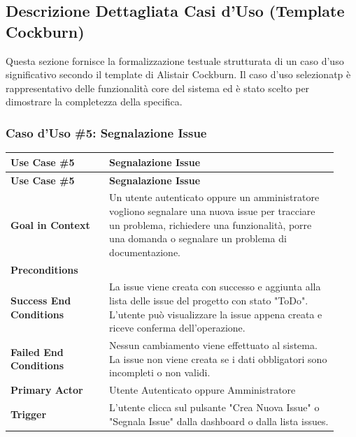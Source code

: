 \subsection{Descrizione Dettagliata Casi d'Uso (Template Cockburn)}
\label{sec:cockburn}

Questa sezione fornisce la formalizzazione testuale strutturata di un caso d'uso significativo secondo il template di Alistair Cockburn. Il caso d'uso selezionatp è rappresentativo delle funzionalità core del sistema ed è stato scelto per dimostrare la completezza della specifica.

\subsubsection{Caso d'Uso \#5: Segnalazione Issue}
\label{subsec:cockburn-segnala-issue}

\begin{longtable}{|p{0.28\linewidth}|p{0.65\linewidth}|}
\hline
\textbf{Use Case \#5} & \textbf{Segnalazione Issue} \\ \hline
\endfirsthead

\hline
\textbf{Use Case \#5} & \textbf{Segnalazione Issue} \\ \hline
\endhead

\hline
\endfoot

\textbf{Goal in Context} & Un utente autenticato oppure un amministratore vogliono segnalare una nuova issue per tracciare un problema, richiedere una funzionalità, porre una domanda o segnalare un problema di documentazione. \\ \hline

\textbf{Preconditions} & \\ \hline

\textbf{Success End Conditions} & La issue viene creata con successo e aggiunta alla lista delle issue del progetto con stato "ToDo". L'utente può visualizzare la issue appena creata e riceve conferma dell'operazione. \\ \hline

\textbf{Failed End Conditions} & Nessun cambiamento viene effettuato al sistema. La issue non viene creata se i dati obbligatori sono incompleti o non validi. \\ \hline

\textbf{Primary Actor} & Utente Autenticato oppure Amministratore \\ \hline

\textbf{Trigger} & L'utente clicca sul pulsante "Crea Nuova Issue" o "Segnala Issue" dalla dashboard o dalla lista issues. \\ \hline

\end{longtable}

